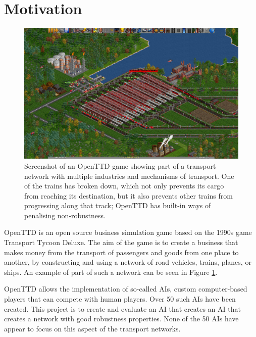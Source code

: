 \documentclass[a4paper,11pt]{article}
\begin{document}
\setcounter{page}{1}                            %
\footruleheight{1pt}
\headruleheight{1pt}
\rhead{- \thepage}
\cfoot{}
%


\section{Motivation}

\begin{figure}[h]
\centering
\includegraphics[width=\textwidth]{transport-tycoon-screenshot.png}
\caption{Screenshot of an OpenTTD game showing part of a transport network with multiple industries and mechanisms of transport. One of the trains has broken down, which not only prevents its cargo from reaching its destination, but it also prevents other trains from progressing along that track; OpenTTD has built-in ways of penalising non-robustness.}
\label{fig:network}
\end{figure}

OpenTTD is an open source business simulation game based on the 1990s game Transport Tycoon Deluxe. The aim of the game is to create a business that makes money from the transport of passengers and goods from one place to another, by constructing and using a network of road vehicles, trains, planes, or ships. An example of part of such a network can be seen in Figure \ref{fig:network}.

OpenTTD allows the implementation of so-called AIs, custom computer-based players that can compete with human players. Over 50 such AIs have been created. This project is to create and evaluate an AI that creates an AI that creates a network with good robustness properties. None of the 50 AIs have appear to focus on this aspect of the transport networks.
\end{document}
